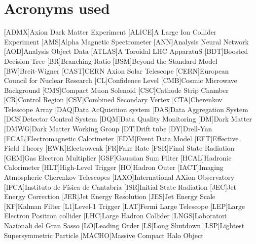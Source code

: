 \documentclass[a4paper, 10pt, openright]{report}
\begin{document}
\newpage
\pagestyle{empty}
\chapter*{Acronyms used}

\begin{multicols}{2}
\begin{acronym}

[ADMX]{Axion Dark Matter Experiment}
[ALICE]{A Large Ion Collider Experiment}
[AMS]{Alpha Magnetic Spectrometer}
[ANN]{Analysis Neural Network}
[AOD]{Analysis Object Data}
[ATLAS]{A Toroidal LHC ApparatuS}
[BDT]{Boosted Decision Tree}
[BR]{Branching Ratio}
[BSM]{Beyond the Standard Model}
[BW]{Breit-Wigner}
[CAST]{CERN Axion Solar Telescope}
[CERN]{European Council for Nuclear Research}
[CL]{Confidence Level}
[CMB]{Cosmic Microwave Background}
[CMS]{Compact Muon Solenoid}
[CSC]{Cathode Strip Chamber}
[CR]{Control Region}
[CSV]{Combined Secondary Vertex}
[CTA]{Cherenkov Telescope Array}
[DAQ]{Data AcQuisition system}
[DAS]{Data Aggregation System}
[DCS]{Detector Control System}
[DQM]{Data Quality Monitoring}
[DM]{Dark Matter}
[DMWG]{Dark Matter Working Group}
[DT]{Drift tube}
[DY]{Drell-Yan}
[ECAL]{Electromagnetic Calorimeter}
[EDM]{Event Data Model}
[EFT]{Effective Field Theory}
[EWK]{Electroweak}
[FR]{Fake Rate}
[FSR]{Final State Radiation}
[GEM]{Gas Electron Multiplier}
[GSF]{Gaussian Sum Filter}
[HCAL]{Hadronic Calorimeter}
[HLT]{High-Level Trigger}
[HO]{Hadron Outer}
[IACT]{Imaging Atmospheric Cherenkov Telescopes}
[IAXO]{International AXion Observatory}
[IFCA]{Instituto de F\'{i}sica de Cantabria}
[ISR]{Initial State Radiation}
[JEC]{Jet Energy Correction}
[JER]{Jet Energy Resolution}
[JES]{Jet Energy Scale}
[KF]{Kalman Filter}
[L1]{Level-1 Trigger}
[LAT]{Fermi Large Telescope}
[LEP]{Large Electron Positron collider}
[LHC]{Large Hadron Collider}
[LNGS]{Laboratori Nazionali del Gran Sasso}
[LO]{Leading Order}
[LS]{Long Shutdown}
[LSP]{Lightest Supersymmetric Particle}
[MACHO]{Massive Compact Halo Object}

\end{acronym}
\end{multicols}
\end{document}
